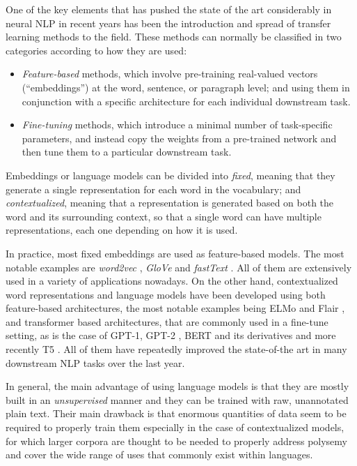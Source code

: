 One of the key elements that has pushed the state of the art considerably in neural NLP in recent years has been the introduction and spread of transfer learning methods to the field. These methods can normally be classified in two categories according to how they are used:
\begin{itemize}
    \item \emph{Feature-based} methods, which involve pre-training real-valued vectors (``embeddings'') at the word, sentence, or paragraph level; and using them in conjunction with a specific architecture for each individual downstream task.
    \item \emph{Fine-tuning} methods, which introduce a minimal number of task-specific parameters, and instead copy the weights from a pre-trained network and then tune them to a particular downstream task.
\end{itemize}
Embeddings or language models can be divided into \emph{fixed}, meaning that they generate a single representation for each word in the vocabulary; and \emph{contextualized}, meaning that a representation is generated based on both the word and its surrounding context, so that a single word can have multiple representations, each one depending on how it is used.

In practice, most fixed embeddings are used as feature-based models. The most notable examples are \emph{word2vec} \citep{mikolov-etal-2013-distributed}, \emph{GloVe} \citep{pennington-etal-2014-glove} and \emph{fastText} \citep{mikolov-etal-2018-advances}. All of them are extensively used in a variety of applications nowadays. On the other hand, contextualized word representations and language models have been developed using both feature-based architectures, the most notable examples being ELMo and Flair \citep{peters-etal-2018-deep,akbik-etal-2018-contextual}, and transformer based architectures, that are commonly used in a fine-tune setting, as is the case of GPT-1, GPT-2 \citep{radford-etal-2018-improving,radford-etal-2019-language}, BERT and its derivatives \citep{devlin-etal-2019-bert,liu-etal-2019-roberta,lan-etal-2020-albert} and more recently T5 \citep{raffel-etal-2020-exploring}. All of them have repeatedly improved the state-of-the art in many downstream NLP tasks over the last year.

In general, the main advantage of using language models is that they are mostly built in an \emph{unsupervised} manner and they can be trained with raw, unannotated plain text. Their main drawback is that enormous quantities of data seem to be required to properly train them especially in the case of contextualized models, for which larger corpora are thought to be needed to properly address polysemy and cover the wide range of uses that commonly exist within languages.

